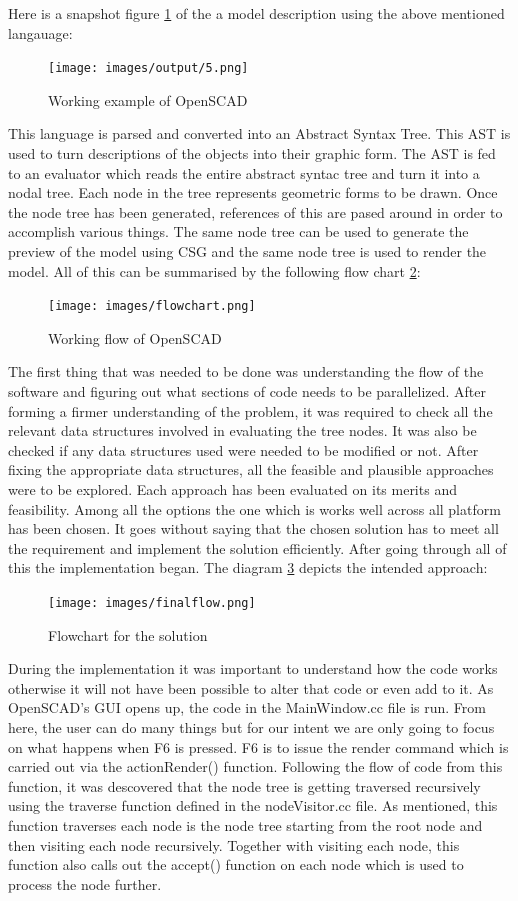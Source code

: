 Here is a snapshot figure \ref{fig:5} of the a model description using the above mentioned langauage:
\begin{figure}
    \centering \texttt{[image: images/output/5.png]}
    \caption{Working example of OpenSCAD}
    \label{fig:5}
\end{figure}
This language is parsed and converted into an Abstract Syntax Tree. This AST is used to turn descriptions of the objects into their graphic form. The AST is fed to an evaluator which reads the entire abstract syntac tree and turn it into a nodal tree. Each node in the tree represents geometric forms to be drawn. Once the node tree has been generated, references of this are pased around in order to accomplish various things. The same node tree can be used to generate the preview of the model using CSG and the same node tree is used to render the model. All of this can be summarised by the following flow chart \ref{fig:flowchart}:
\begin{figure}
    \centering 
    \texttt{[image: images/flowchart.png]}
    \caption{Working flow of OpenSCAD}
    \label{fig:flowchart}
\end{figure}
The first thing that was needed to be done was understanding the flow of the software and figuring out what sections of code needs to be parallelized. After forming a firmer understanding of the problem, it was required to check all the relevant data structures involved in evaluating the tree nodes. It was also be checked if any data structures used were needed to be modified or not. After fixing the appropriate data structures, all the feasible and plausible approaches were to be explored. Each approach has been evaluated on its merits and feasibility. Among all the options the one which is works well across all platform has been chosen. It goes without saying that the chosen solution has to meet all the requirement and implement the solution efficiently. After going through all of this the implementation began. The diagram \ref{fig:finalflow} depicts the intended approach:
\begin{figure}
    \centering 
    \texttt{[image: images/finalflow.png]}
    \caption{Flowchart for the solution}
    \label{fig:finalflow}
\end{figure}
During the implementation it was important to understand how the code works otherwise it will not have been possible to alter that code or even add to it. As OpenSCAD's GUI opens up, the code in the MainWindow.cc file is run. From here, the user can do many things but for our intent we are only going to focus on what happens when F6 is pressed. F6 is to issue the render command which is carried out via the actionRender() function. Following the flow of code from this function, it was descovered that the node tree is getting traversed recursively using the traverse function defined in the nodeVisitor.cc file. As mentioned, this function traverses each node is the node tree starting from the root node and then visiting each node recursively. Together with visiting each node, this function also calls out the accept() function on each node which is used to process the node further.\\
